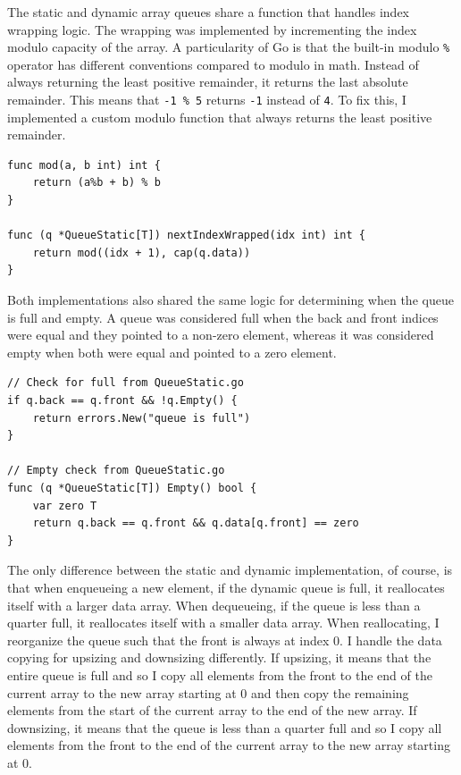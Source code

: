 \documentclass[a4paper,11pt]{article}
\begin{document}
    The static and dynamic array queues share a function that handles index wrapping logic. The wrapping was implemented by incrementing the index modulo capacity of the array. A particularity of Go is that the built-in modulo \texttt{\%} operator has different conventions compared to modulo in math. Instead of always returning the least positive remainder, it returns the last absolute remainder. This means that \texttt{-1 \% 5} returns \texttt{-1} instead of \texttt{4}. To fix this, I implemented a custom modulo function that always returns the least positive remainder. 

    \begin{verbatim}
func mod(a, b int) int {
    return (a%b + b) % b
}       

func (q *QueueStatic[T]) nextIndexWrapped(idx int) int {
    return mod((idx + 1), cap(q.data))
}
    \end{verbatim}

    Both implementations also shared the same logic for determining when the queue is full and empty. A queue was considered full when the back and front indices were equal and they pointed to a non-zero element, whereas it was considered empty when both were equal and pointed to a zero element.

\begin{verbatim}
// Check for full from QueueStatic.go
if q.back == q.front && !q.Empty() {
    return errors.New("queue is full")
}

// Empty check from QueueStatic.go
func (q *QueueStatic[T]) Empty() bool {
    var zero T
    return q.back == q.front && q.data[q.front] == zero
}
\end{verbatim}

    The only difference between the static and dynamic implementation, of course, is that when enqueueing a new element, if the dynamic queue is full, it reallocates itself with a larger data array. When dequeueing, if the queue is less than a quarter full, it reallocates itself with a smaller data array. When reallocating, I reorganize the queue such that the front is always at index 0. I handle the data copying for upsizing and downsizing differently. If upsizing, it means that the entire queue is full and so I copy all elements from the front to the end of the current array to the new array starting at 0 and then copy the remaining elements from the start of the current array to the end of the new array. If downsizing, it means that the queue is less than a quarter full and so I copy all elements from the front to the end of the current array to the new array starting at 0.
\end{document}
